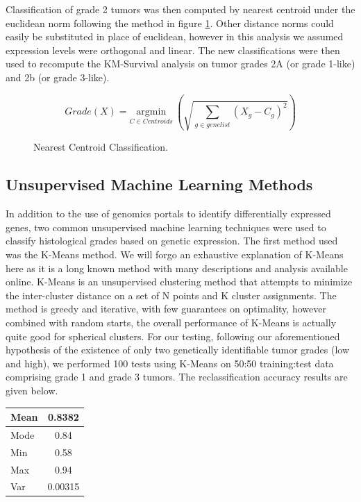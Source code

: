 \documentclass[a4paper,10pt]{article}
\begin{document}
Classification of grade 2 tumors was then computed by nearest centroid under the euclidean norm following the method in figure \ref{classify}.
Other distance norms could easily be substituted in place of euclidean, however in this analysis we assumed expression levels were orthogonal
and linear. The new classifications were then used to recompute the KM-Survival analysis on tumor grades 2A (or grade 1-like) and 2b (or grade 3-like).
\begin{figure}
 $$
Grade(X) = \underset{C \in Centroids} {\mathrm{argmin}} ~ \left( \sqrt{\sum_{g\in genelist}{ (X_{g} - C_{g})^2}}\right)
$$
\caption{Nearest Centroid Classification.}\label{classify}
\end{figure}

\subsection{Unsupervised Machine Learning Methods}
In addition to the use of genomics portals to identify differentially expressed genes, two common unsupervised machine learning techniques were
used to classify histological grades based on genetic expression. The first method used was the K-Means method. We will forgo an exhaustive explanation
of K-Means here as it is a long known method with many descriptions and analysis available online. K-Means is an unsupervised clustering method
that attempts to minimize the inter-cluster distance on a set of N points and K cluster assignments. The method is greedy and iterative, with few guarantees
on optimality, however combined with random starts, the overall performance of K-Means is actually quite good for spherical clusters\cite{kmeans}. 
For our testing, following our aforementioned hypothesis of the existence of only two genetically identifiable tumor grades (low and high), we performed
100 tests using K-Means on 50:50 training:test data comprising grade 1 and grade 3 tumors. The reclassification accuracy results are given below.\\
\begin{center}
\begin{tabular}{| l | c | }
    \hline
    Mean & 0.8382  \\ \hline
    Mode & 0.84 \\ \hline
    Min & 0.58  \\ \hline
    Max & 0.94  \\ \hline
     Var &  0.00315  \\ \hline
  \end{tabular}
\end{center}
\end{document}

